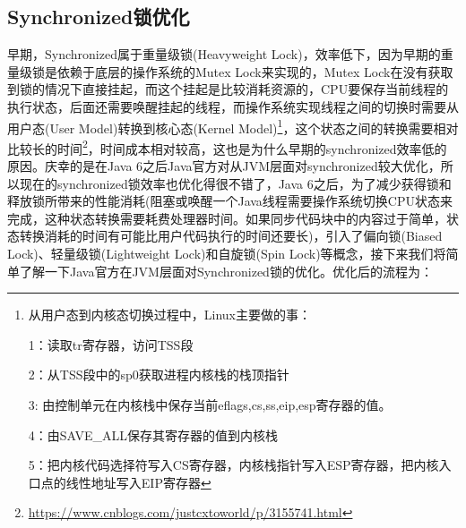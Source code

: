 \documentclass[../../../interview-questions.tex]{subfiles}
\begin{document}
\subsection{Synchronized锁优化}

早期，Synchronized属于重量级锁(Heavyweight Lock)，效率低下，因为早期的重量级锁是依赖于底层的操作系统的Mutex Lock来实现的，Mutex Lock在没有获取到锁的情况下直接挂起，而这个挂起是比较消耗资源的，CPU要保存当前线程的执行状态，后面还需要唤醒挂起的线程，而操作系统实现线程之间的切换时需要从用户态(User Model)转换到核心态(Kernel Model)\footnote{从用户态到内核态切换过程中，Linux主要做的事：

1：读取tr寄存器，访问TSS段

2：从TSS段中的sp0获取进程内核栈的栈顶指针

3:  由控制单元在内核栈中保存当前eflags,cs,ss,eip,esp寄存器的值。

4：由SAVE\_ALL保存其寄存器的值到内核栈

5：把内核代码选择符写入CS寄存器，内核栈指针写入ESP寄存器，把内核入口点的线性地址写入EIP寄存器}，这个状态之间的转换需要相对比较长的时间\footnote{\url{https://www.cnblogs.com/justcxtoworld/p/3155741.html}}，时间成本相对较高，这也是为什么早期的synchronized效率低的原因。庆幸的是在Java 6之后Java官方对从JVM层面对synchronized较大优化，所以现在的synchronized锁效率也优化得很不错了，Java 6之后，为了减少获得锁和释放锁所带来的性能消耗(阻塞或唤醒一个Java线程需要操作系统切换CPU状态来完成，这种状态转换需要耗费处理器时间。如果同步代码块中的内容过于简单，状态转换消耗的时间有可能比用户代码执行的时间还要长)，引入了偏向锁(Biased Lock)、轻量级锁(Lightweight Lock)和自旋锁(Spin Lock)等概念，接下来我们将简单了解一下Java官方在JVM层面对Synchronized锁的优化。优化后的流程为：
\end{document}
